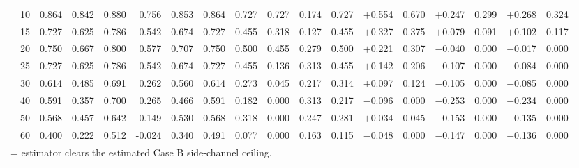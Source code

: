 \begin{table}[ht]
{\begin{tabular}{p{2.2cm}r rrrr rr rr rr rr rr rr}
  & 10 & 0.864 & 0.842 & 0.880 & 0.756 & 0.853 & 0.864 & 0.727 & 0.727 & 0.174 & 0.727 & \cellcolor{green!15}$+$0.554 & \cellcolor{green!15}0.670 & \cellcolor{green!15}$+$0.247 & \cellcolor{green!15}0.299 & \cellcolor{green!15}$+$0.268 & \cellcolor{green!15}0.324 \\
  & 15 & 0.727 & 0.625 & 0.786 & 0.542 & 0.674 & 0.727 & 0.455 & 0.318 & 0.127 & 0.455 & \cellcolor{green!15}$+$0.327 & \cellcolor{green!15}0.375 & \cellcolor{green!15}$+$0.079 & \cellcolor{green!15}0.091 & \cellcolor{green!15}$+$0.102 & \cellcolor{green!15}0.117 \\
  & 20 & 0.750 & 0.667 & 0.800 & 0.577 & 0.707 & 0.750 & 0.500 & 0.455 & 0.279 & 0.500 & \cellcolor{green!15}$+$0.221 & \cellcolor{green!15}0.307 & $-$0.040 & 0.000 & $-$0.017 & 0.000 \\
  & 25 & 0.727 & 0.625 & 0.786 & 0.542 & 0.674 & 0.727 & 0.455 & 0.136 & 0.313 & 0.455 & \cellcolor{green!15}$+$0.142 & \cellcolor{green!15}0.206 & $-$0.107 & 0.000 & $-$0.084 & 0.000 \\
  & 30 & 0.614 & 0.485 & 0.691 & 0.262 & 0.560 & 0.614 & 0.273 & 0.045 & 0.217 & 0.314 & \cellcolor{green!15}$+$0.097 & \cellcolor{green!15}0.124 & $-$0.105 & 0.000 & $-$0.085 & 0.000 \\
  & 40 & 0.591 & 0.357 & 0.700 & 0.265 & 0.466 & 0.591 & 0.182 & 0.000 & 0.313 & 0.217 & $-$0.096 & 0.000 & $-$0.253 & 0.000 & $-$0.234 & 0.000 \\
  & 50 & 0.568 & 0.457 & 0.642 & 0.149 & 0.530 & 0.568 & 0.318 & 0.000 & 0.247 & 0.281 & \cellcolor{green!15}$+$0.034 & \cellcolor{green!15}0.045 & $-$0.153 & 0.000 & $-$0.135 & 0.000 \\
  & 60 & 0.400 & 0.222 & 0.512 & -0.024 & 0.340 & 0.491 & 0.077 & 0.000 & 0.163 & 0.115 & $-$0.048 & 0.000 & $-$0.147 & 0.000 & $-$0.136 & 0.000 \\
\bottomrule
\multicolumn{18}{l}{\colorbox{green!15}{\phantom{X}} = estimator clears the estimated Case B side-channel ceiling.}
\end{tabular}%
}
\end{table}

